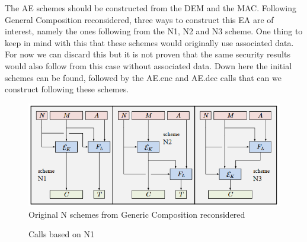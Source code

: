 \documentclass{article}
\begin{document}
\noindent The AE schemes should be constructed from the DEM and the MAC. Following General Composition reconsidered, three ways to construct this EA are of interest, namely the ones following from the N1, N2 and N3 scheme. One thing to keep in mind with this that these schemes would originally use associated data. For now we can discard this but it is not proven that the same security results would also follow from this case without associated data. Down here the initial schemes can be found, followed by the AE.enc and AE.dec calls that can we construct following these schemes.
\begin{figure}[H]
    \centering
    \includegraphics[scale = 0.7]{gebrabbel images/N games.png}
\caption{Original N schemes from Generic Composition reconsidered}
\end{figure}

\begin{figure}[H]
    \begin{pchstack}[boxed,center,space=0.5cm]
    \end{pchstack}
\caption{Calls based on N1}
\end{figure}
\end{document}
